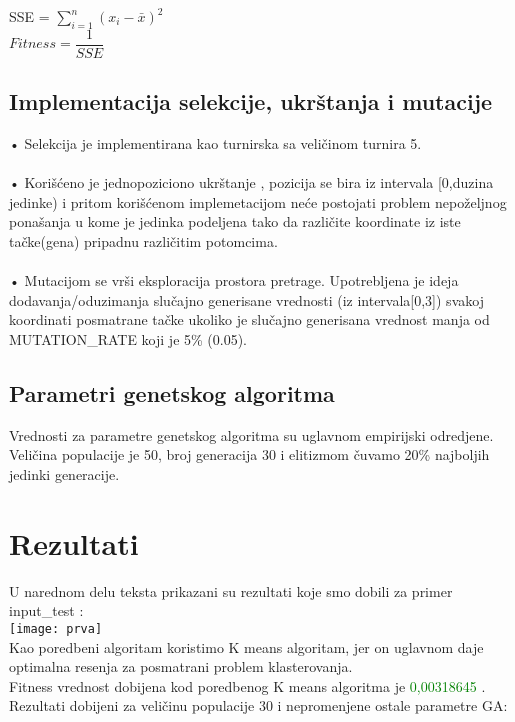 \documentclass[]{article}
\begin{document}
	SSE = $\sum_{i=1}^{n} (x_i - \bar x)^{2}$\\ 
	
	$ Fitness = \dfrac{1}{SSE}$
	
	\subsection{Implementacija selekcije, ukr\v{s}tanja i mutacije}
	\-\quad • Selekcija je implementirana kao turnirska sa veli\v{c}inom turnira 5. \\ \\
	\-\quad • Kori\v{s}\'{c}eno je jednopoziciono ukr\v{s}tanje ,  pozicija se bira iz intervala [0,duzina jedinke)  i pritom kori\v{s}\'{c}enom  implemetacijom  ne\'{c}e postojati problem nepo\v{z}eljnog pona\v{s}anja u kome je jedinka podeljena tako da različite koordinate iz iste ta\v{c}ke(gena) pripadnu razli\v{c}itim potomcima.\\ \\
	\-\quad • Mutacijom se vr\v{s}i eksploracija prostora pretrage. Upotrebljena je ideja dodavanja/oduzimanja slu\v{c}ajno generisane vrednosti (iz intervala[0,3])  svakoj koordinati posmatrane ta\v{c}ke ukoliko je slu\v{c}ajno generisana vrednost manja od MUTATION\_RATE koji je 5\% (0.05).\vspace{0.5cm}\\
	\subsection{Parametri genetskog algoritma}
	Vrednosti za parametre genetskog algoritma su uglavnom empirijski odredjene. Veli\v{c}ina populacije je 50, broj generacija 30 
	i elitizmom \v{c}uvamo 20\% najboljih jedinki generacije. 
	



	\section{Rezultati}
	U narednom delu teksta  prikazani su rezultati koje smo dobili za primer input\_test :\\
	\texttt{[image: prva]}
	\vspace{0.5cm}\\Kao poredbeni algoritam koristimo K means algoritam, jer on uglavnom daje optimalna resenja za posmatrani problem klasterovanja.	\vspace{0.5cm}\\
	Fitness vrednost dobijena kod poredbenog K means algoritma je \textcolor{green}{0,00318645} . \newpage
	Rezultati dobijeni za veličinu populacije 30 i nepromenjene ostale parametre GA:\vspace{0.5cm}\\
	 
\end{document}
